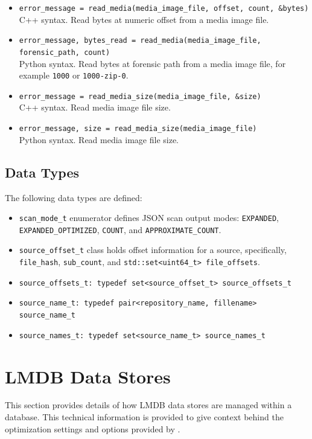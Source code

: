 \documentclass[11pt,fleqn]{article} %
\begin{document}
\begin{itemize}
\item \verb+error_message = read_media(media_image_file, offset, count, &bytes)+\\
C++ syntax.  Read bytes at numeric offset from a media image file.
\item \verb+error_message, bytes_read = read_media(media_image_file, forensic_path, count)+\\
Python syntax. Read bytes at forensic path from a media image file, for example \verb+1000+ or \verb+1000-zip-0+.
\item \verb+error_message = read_media_size(media_image_file, &size)+\\
C++ syntax.  Read media image file size.
\item \verb+error_message, size = read_media_size(media_image_file)+\\
Python syntax. Read media image file size.
\end{itemize}

\subsection{Data Types}

The following data types are defined:

\begin{itemize}
\item \verb+scan_mode_t+ enumerator defines JSON scan output modes: \verb+EXPANDED+, \verb+EXPANDED_OPTIMIZED+, \verb+COUNT+, and \verb+APPROXIMATE_COUNT+.
\item \verb+source_offset_t+ class holds offset information for a source, specifically, \verb+file_hash+, \verb+sub_count+, and \verb+std::set<uint64_t> file_offsets+.
\item \verb+source_offsets_t: typedef set<source_offset_t> source_offsets_t+
\item \verb+source_name_t: typedef pair<repository_name, fillename> source_name_t+
\item \verb+source_names_t: typedef set<source_name_t> source_names_t+
\end{itemize}

\section{LMDB Data Stores}
\label{LMDBDataStores}
This section provides details of how LMDB data stores are managed within a \hdb database. This technical information is provided to give context behind the optimization settings and options provided by \hdb.\\
\end{document}
